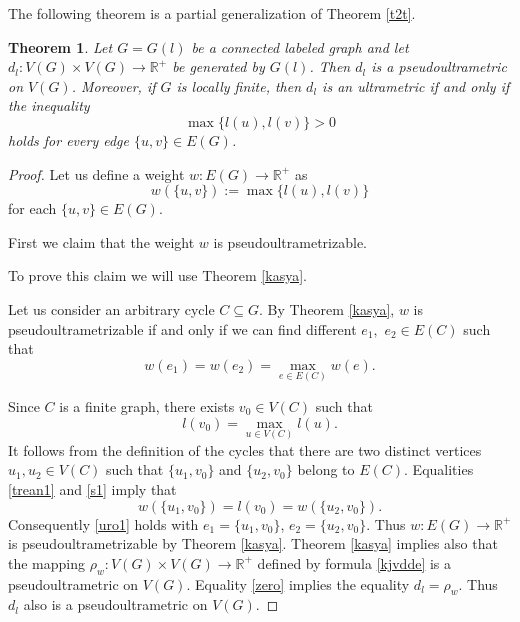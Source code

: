 \documentclass[pdflatex,sn-mathphys-num]{sn-jnl}%
\theoremstyle{thmstyleone}%
\newtheorem{Theorem}{Theorem}[section]
\theoremstyle{thmstyletwo}%
\theoremstyle{thmstylethree}%
\theoremstyle{thmstyletwo}%
\theoremstyle{thmstylethree}%
\begin{document}
The following theorem is a partial generalization of Theorem \ref{t2t}.



\begin{Theorem}\label{tteo5} Let $G = G(l)$ be a connected  labeled graph  and let  $d_l : V(G)\times V(G) \to \mathbb{R}^{+}$
be generated by $G(l)$.
Then $d_l$ is  a pseudoultrametric on $V(G)$. Moreover, if $G$ is locally finite, then $d_l$ is an ultrametric if and only if the inequality
\begin{equation}\label{eq:10}
\max\{l(u),l(v)\} > 0
\end{equation}
holds for every edge $\{u,v\} \in E(G)$.
\end{Theorem}

 \begin{proof}


Let us define a weight
\(
w : E(G) \to \mathbb{R}^+
\)
as
\begin{equation}
    \label{trean1}
w(\{u,v\}) := \max \{ l(u), l(v) \}
\end{equation}
for each $\{u,v\} \in E(G).$

First we claim that the weight $w$ is pseudoultrametrizable.

To prove this claim we will use Theorem \ref{kasya}.

Let us consider an arbitrary cycle $C \subseteq G.$
By Theorem \ref{kasya}, $w$ is pseudoultrametrizable if and only if we can find
different $e_1,$ $e_2 \in E(C)$ such that
\begin{equation}
    \label{uro1}
w(e_1) = w(e_2) = \max_{e \in E(C)} w(e).
\end{equation}




Since $C$ is a finite graph, there exists $v_0 \in V(C)$ such that
\begin{equation}
    \label{s1}
l(v_0) = \max_{u \in V(C)} l(u). 
\end{equation}
It follows from the definition of the cycles that there are two distinct vertices $u_1, u_2 \in V(C)$ such that $\{u_1, v_0\}$ and $\{u_2, v_0\}$ belong to $E(C)$. Equalities \eqref{trean1} and \eqref{s1} imply that
\[
w(\{u_1, v_0\}) = l(v_0) = w(\{u_2, v_0\}).
\]
Consequently \eqref{uro1} holds with $e_1 = \{u_1, v_0\}$, $e_2 = \{u_2, v_0\}$.
Thus $w : E(G) \to \mathbb{R}^+$ is pseudoultrametrizable by Theorem \ref{kasya}.
Theorem \ref{kasya} implies also that the mapping $\rho_w : V(G) \times V(G) \to \mathbb{R}^+$ 
defined by formula \eqref{kjvdde} is a pseudoultrametric on $V(G)$. 
Equality \eqref{zero} implies the equality $d_l=\rho_w$. Thus $d_l$ also is a pseudoultrametric on $V(G)$.




\end{proof}
\end{document}
